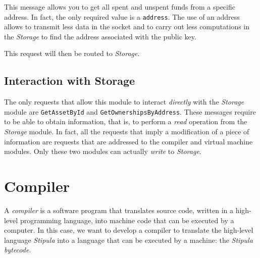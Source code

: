 This message allows you to get all spent and unspent funds from a specific address. In fact, the only 
required value is a \verb|address|. The use of an address allows to transmit less data in the socket and 
to carry out less computations in the \textit{Storage} to find the address associated with the public key.

This request will then be routed to \textit{Storage}.

\subsection{Interaction with Storage}

The only requests that allow this module to interact \textit{directly} with the \textit{Storage} module 
are \verb|GetAssetById| and \verb|GetOwnershipsByAddress|. These messages require to be able to obtain 
information, that is, to perform a \textit{read} operation from the \textit{Storage} module. In fact, all 
the requests that imply a modification of a piece of information are requests that are addressed to the 
compiler and virtual machine modules. Only these two modules can actually \textit{write} to 
\textit{Storage}.

\section{Compiler}
\label{compiler}

A \textit{compiler} is a software program that translates source code, written in a high-level programming 
language, into machine code that can be executed by a computer. In this case, we want to develop a 
compiler to translate the high-level language \textit{Stipula} into a language that can be executed by a 
machine: the \textit{Stipula bytecode}.

